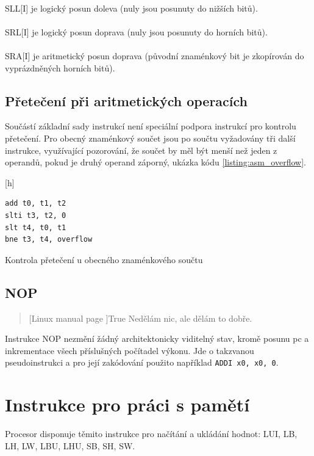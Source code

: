 \documentclass[FM,BP]{tulthesis}
\newcommand{\argument}[1]{{\ttfamily\color{\tulcolor}#1}}
\newcommand{\argumentindex}[1]{\argument{#1}\index{#1}}
\newenvironment{myquote}{\begin{list}{}{\setlength\leftmargin\parindent}\item[]}{\end{list}}
\newenvironment{listing}{\begin{myquote}\color{\tulcolor}}{\end{myquote}}
\begin{document}
\paragraph{}
\argument{SLL[I]} je logický posun doleva (nuly jsou posunuty do nižších bitů). 
\paragraph{}
\argument{SRL[I]} je logický posun doprava (nuly jsou posunuty do horních bitů). 
\paragraph{}
\argument{SRA[I]} je aritmetický posun doprava (původní znaménkový bit je zkopírován do vyprázdněných horních bitů).


\subsection{Přetečení při aritmetických operacích}
Součástí základní sady instrukcí není speciální podpora instrukcí pro kontrolu přetečení. Pro obecný znaménkový součet jsou po součtu vyžadovány tři další instrukce, využívající pozorování, že součet by měl být menší než jeden z operandů, pokud je druhý operand záporný, ukázka kódu \ref{listing:asm_overflow}.

\begin{listing}[h]
    \begin{verbatim}
add t0, t1, t2
slti t3, t2, 0
slt t4, t0, t1
bne t3, t4, overflow
    \end{verbatim}
    \caption{Kontrola přetečení u obecného znaménkového součtu}
    \label{listing:asm_overflow}
\end{listing}

\newpage
\subsection{NOP}

\begin{quote}[Linux manual page \cite{man_page_true}]{True}
Nedělám nic, ale dělám to dobře.
\end{quote}

Instrukce \argumentindex{NOP} nezmění žádný architektonicky viditelný stav, kromě posunu pc a inkrementace všech příslušných počítadel výkonu. Jde o takzvanou pseudoinstrukci a pro její zakódování použito například \verb|ADDI x0, x0, 0|.

\section{Instrukce pro práci s pamětí} \label{kap:Instrukce pro práci s pamětí}
Procesor disponuje těmito instrukce pro načítání a ukládání hodnot: \argumentindex{LUI}, \argumentindex{LB}, \argumentindex{LH}, \argumentindex{LW}, \argumentindex{LBU}, \argumentindex{LHU}, \argumentindex{SB}, \argumentindex{SH}, \argumentindex{SW}.
\end{document}
